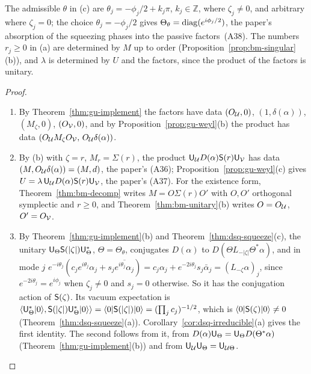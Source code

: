 \begin{veteenv}
The admissible $\theta$ in (c) are $\theta_j=-\phi_j/2+k_j\pi$, $k_j\in\mathbb Z$, where $\zeta_j\ne0$, and arbitrary where
$\zeta_j=0$; the choice $\theta_j=-\phi_j/2$ gives
$\Theta_\theta=\operatorname{diag}(e^{i\phi_j/2})$, the paper's absorption of the squeezing phases into the passive factors~(A38). The numbers
$r_j\ge0$ in (a) are determined by $M$ up to order (Proposition~\ref{prop:bm-singular}(b)), and $\lambda$ is determined by $U$ and the
factors, since the product of the factors is unitary.

\begin{proof}
\begin{enumerate}
\item[(b)] By Theorem~\ref{thm:gu-implement} the factors have data $(O_\mathcal U,0)$, $(1,\delta(\alpha))$, $(M_\zeta,0)$, $(O_\mathcal V,0)$, and by
Proposition~\ref{prop:gu-weyl}(b) the product has data $(O_\mathcal U M_\zeta O_\mathcal V,\,O_\mathcal U\delta(\alpha))$.
\item[(a)] By (b) with $\zeta=r$, $M_r=\Sigma(r)$, the product $\mathsf U_\mathcal U D(\alpha)\mathsf S(r)\mathsf U_\mathcal V$ has data $(M,O_\mathcal U\delta(\alpha))=(M,d)$,
the paper's (A36); Proposition~\ref{prop:gu-weyl}(c) gives $U=\lambda\,\mathsf U_\mathcal U D(\alpha)\mathsf S(r)\mathsf U_\mathcal V$, the paper's (A37). For the existence
form, Theorem~\ref{thm:bm-decomp} writes $M=O\Sigma(r)O'$ with $O,O'$ orthogonal symplectic and $r\ge0$, and
Theorem~\ref{thm:bm-unitary}(b) writes $O=O_\mathcal U$, $O'=O_\mathcal V$.
\item[(c)] By Theorem~\ref{thm:gu-implement}(b) and Theorem~\ref{thm:dsq-squeeze}(c), the unitary $\mathsf U_{\Theta}\mathsf S(\lvert\zeta\rvert)\mathsf U_{\Theta}^*$,
$\Theta=\Theta_\theta$, conjugates $D(\alpha)$ to $D(\Theta L_{-\lvert\zeta\rvert}\Theta^*\alpha)$, and in mode $j$
$e^{-i\theta_j}(c_je^{i\theta_j}\alpha_j+s_j\overline{e^{i\theta_j}\alpha_j})=c_j\alpha_j+e^{-2i\theta_j}s_j\bar\alpha_j=(L_{-\zeta}\alpha)_j$, since
$e^{-2i\theta_j}=e^{i\phi_j}$ when $\zeta_j\ne0$ and $s_j=0$ otherwise. So it has the conjugation action of $\mathsf S(\zeta)$. Its vacuum
expectation is $\langle\mathsf U_\Theta^*\lvert 0\rangle,\mathsf S(\lvert\zeta\rvert)\mathsf U_\Theta^*\lvert 0\rangle\rangle=\langle0\rvert\mathsf S(\lvert\zeta\rvert)\lvert 0\rangle=(\prod_jc_j)^{-1/2}$,
which is $\langle0\rvert\mathsf S(\zeta)\lvert 0\rangle\ne0$ (Theorem~\ref{thm:dsq-squeeze}(a)). Corollary~\ref{cor:dsq-irreducible}(a) gives the first identity.
The second follows from it, from $D(\alpha)\mathsf U_\Theta=\mathsf U_\Theta D(\Theta^*\alpha)$ (Theorem~\ref{thm:gu-implement}(b)) and from
$\mathsf U_\mathcal U\mathsf U_\Theta=\mathsf U_{\mathcal U\Theta}$.\qedhere
\end{enumerate}
\end{proof}


\end{veteenv}
